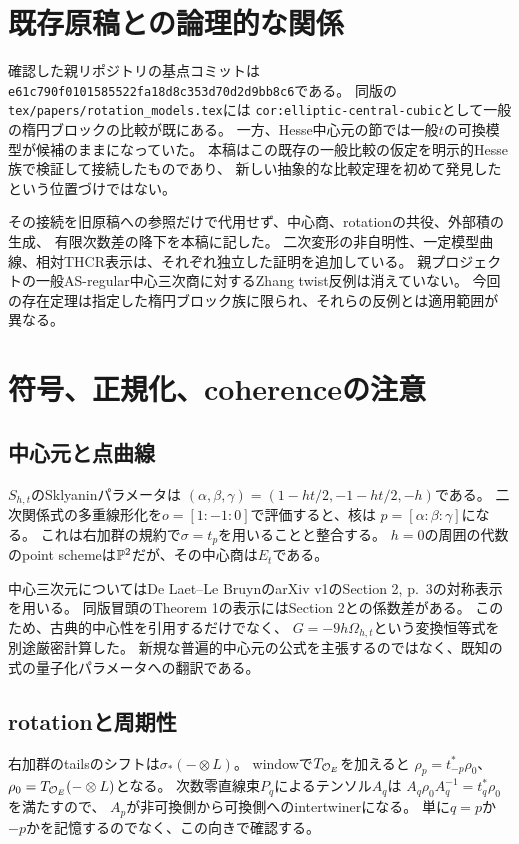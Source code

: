 \section{既存原稿との論理的な関係}
確認した親リポジトリの基点コミットは
\texttt{e61c790f0101585522fa18d8c353d70d2d9bb8c6}である。
同版の\texttt{tex/papers/rotation\_models.tex}には
\texttt{cor:elliptic-central-cubic}として一般の楕円ブロックの比較が既にある。
一方、Hesse中心元の節では一般$t$の可換模型が候補のままになっていた。
本稿はこの既存の一般比較の仮定を明示的Hesse族で検証して接続したものであり、
新しい抽象的な比較定理を初めて発見したという位置づけではない。

その接続を旧原稿への参照だけで代用せず、中心商、rotationの共役、外部積の生成、
有限次数差の降下を本稿に記した。
二次変形の非自明性、一定模型曲線、相対THCR表示は、それぞれ独立した証明を追加している。
親プロジェクトの一般AS-regular中心三次商に対するZhang twist反例は消えていない。
今回の存在定理は指定した楕円ブロック族に限られ、それらの反例とは適用範囲が異なる。

\section{符号、正規化、coherenceの注意}
\subsection{中心元と点曲線}
$S_{h,t}$のSklyaninパラメータは
$(\alpha,\beta,\gamma)=(1-ht/2,-1-ht/2,-h)$である。
二次関係式の多重線形化を$o=[1:-1:0]$で評価すると、核は
$p=[\alpha:\beta:\gamma]$になる。
これは右加群の規約で$\sigma=t_p$を用いることと整合する。
$h=0$の周囲の代数のpoint schemeは$\mathbb P^2$だが、その中心商は$E_t$である。

中心三次元についてはDe Laet--Le BruynのarXiv v1のSection 2, p.~3の対称表示を用いる。
同版冒頭のTheorem 1の表示にはSection 2との係数差がある。
このため、古典的中心性を引用するだけでなく、
$G=-9h\Omega_{h,t}$という変換恒等式を別途厳密計算した。
新規な普遍的中心元の公式を主張するのではなく、既知の式の量子化パラメータへの翻訳である。

\subsection{rotationと周期性}
右加群のtailsのシフトは$\sigma_*(-\otimes L)$。
windowで$T_{\mathcal O_E}$を加えると
$\rho_p=t_{-p}^*\rho_0$、$\rho_0=T_{\mathcal O_E}(-\otimes L)$となる。
次数零直線束$P_q$によるテンソル$A_q$は
$A_q\rho_0A_q^{-1}=t_q^*\rho_0$を満たすので、
$A_p$が非可換側から可換側へのintertwinerになる。
単に$q=p$か$-p$かを記憶するのでなく、この向きで確認する。

